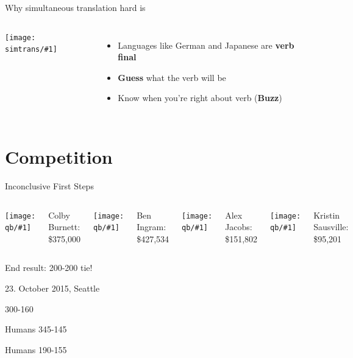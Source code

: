 \documentclass[compress]{beamer}
\newcommand{\fsi}[2]{
\begin{frame}[plain]
\vspace*{-1pt}
\makebox[\linewidth]{\texttt{[image: \#1]}}
\begin{center}
#2
\end{center}
\end{frame}
}
\newcommand{\gfxs}[2]{
\begin{center}
	\texttt{[image: simtrans/\#1]}
\end{center}
}
\newcommand{\gfxq}[2]{
\begin{center}
	\texttt{[image: qb/\#1]}
\end{center}
}
\begin{document}
\begin{frame}{Why simultaneous translation hard is}

  \begin{columns}
       \gfxs{nuremberg_translators}{.9}
       \begin{itemize}
         \item Languages like German and Japanese are {\bf verb final}
         \item {\bf Guess} what the verb will be
         \item Know when you're right about verb ({\bf Buzz})
       \end{itemize}
  \end{columns}

\end{frame}

\section{Competition}

\begin{frame}{Inconclusive First Steps}

		\begin{columns}
				\gfxq{colby_jeo}{1.0}
                                Colby Burnett:
                                \$375,000
				\gfxq{ben_jeo}{1.0}
                                Ben Ingram:
                                \$427,534
				\gfxq{alex_jeo}{1.0}
                                Alex Jacobs: \$151,802
				\gfxq{kristin_jeo}{1.0}
                                Kristin Sausville: \$95,201
		\end{columns}

                \pause

                \begin{center}
                End result: 200-200 tie!
                \end{center}

\end{frame}

\fsi{qb/hsnct1}{}
\fsi{qb/jennings}{23. October 2015, Seattle}
\fsi{qb/jennings_handshake}{300-160}
\fsi{qb/nasat}{Humans 345-145}
\fsi{qb/hsnct_2016}{Humans 190-155}
\end{document}
